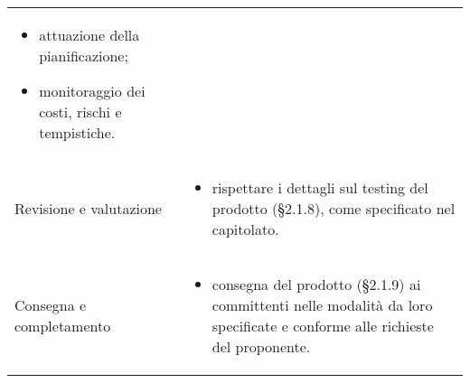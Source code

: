 {\begin{longtable}{C{4cm} C{11cm}}
\begin{itemize}
		\item attuazione della pianificazione;
		\item monitoraggio dei costi, rischi e tempistiche.
	\end{itemize}  \\
Revisione e valutazione & \vspace{-0.5cm}
	\begin{itemize}
		\item rispettare i dettagli sul testing del prodotto (§2.1.8), come specificato nel capitolato.
	\end{itemize}  \\
Consegna e completamento & \vspace{-0.5cm}
	\begin{itemize}
		\item consegna del prodotto (§2.1.9) ai committenti nelle modalità da loro specificate e conforme alle richieste del proponente.
	\end{itemize}  \\

		
\end{longtable}
}